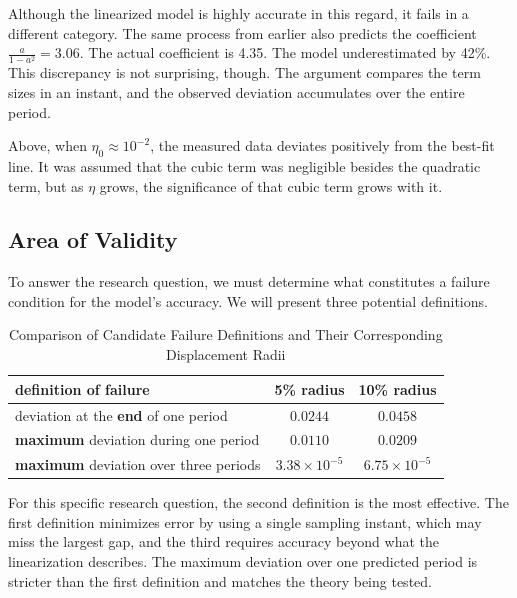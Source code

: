     Although the linearized model is highly accurate in this regard, it fails in a different category. The same process from earlier also predicts the coefficient $\frac{a}{1-a^2}=3.06$. The actual coefficient is 4.35. The model underestimated by 42\%. This discrepancy is not surprising, though. The argument compares the term sizes in an instant, and the observed deviation accumulates over the entire period.

    Above, when $\eta_0\approx 10^{-2}$, the measured data deviates positively from the best-fit line. It was assumed that the cubic term was negligible besides the quadratic term, but as $\eta$ grows, the significance of that cubic term grows with it.

    \subsection{Area of Validity}\label{subsec:area-of-validity}

    To answer the research question, we must determine what constitutes a failure condition for the model's accuracy. We will present three potential definitions.

    \begin{table}[H]
        \centering
        \begin{tabular}{lcc}
            \toprule
            \textbf{definition of failure} & \textbf{5\% radius} & \textbf{10\% radius} \\
            \midrule
            deviation at the \textbf{end} of one period   & $0.0244$            & $0.0458$            \\
            \textbf{maximum} deviation during one period  & $0.0110$            & $\mathbf{0.0209}$   \\
            \textbf{maximum} deviation over three periods & $3.38\times10^{-5}$ & $6.75\times10^{-5}$ \\
            \bottomrule
        \end{tabular}
        \caption{Comparison of Candidate Failure Definitions and Their Corresponding Displacement Radii}
        \label{tab:failure-definitions}
    \end{table}

    For this specific research question, the second definition is the most effective. The first definition minimizes error by using a single sampling instant, which may miss the largest gap, and the third requires accuracy beyond what the linearization describes. The maximum deviation over one predicted period is stricter than the first definition and matches the theory being tested.


